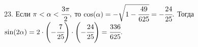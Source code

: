 23. Если $\pi<\alpha<\cfrac{3\pi}{2},$ то  $\cos(\alpha)=-\sqrt{1-\cfrac{49}{625}}=-\cfrac{24}{25}.$ Тогда $\sin(2\alpha)=2\cdot\left(-\cfrac{7}{25}\right)\cdot\left(-\cfrac{24}{25}\right)=\cfrac{336}{625}.$\\
